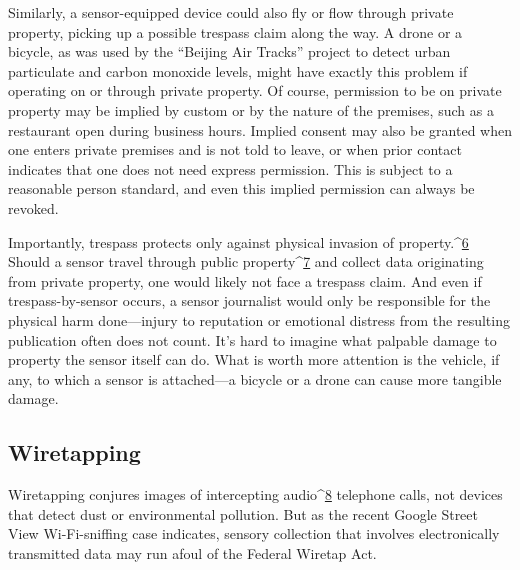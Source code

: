 Similarly, a sensor-equipped device could also fly or flow through private
property, picking up a possible trespass claim along the way. A drone or
a bicycle, as was used by the ``Beijing Air Tracks'' project to detect urban
particulate and carbon monoxide levels, might have exactly this problem if
operating on or through private property. Of course, permission to be on
private property may be implied by custom or by the nature of the premises,
such as a restaurant open during business hours. Implied consent may
also be granted when one enters private premises and is not told to leave,
or when prior contact indicates that one does not need express permission.
This is subject to a reasonable person standard, and even this implied permission
can always be revoked.

Importantly, trespass protects only against physical invasion of property.^{\href{#endnotes-syed}{6}}
Should a sensor travel through public property^{\href{#endnotes-syed}{7}} and collect data originating
from private property, one would likely not face a trespass claim. And even
if trespass-by-sensor occurs, a sensor journalist would only be responsible
for the physical harm done—injury to reputation or emotional distress from
the resulting publication often does not count. It's hard to imagine what
palpable damage to property the sensor itself can do. What is worth more
attention is the vehicle, if any, to which a sensor is attached—a bicycle or a
drone can cause more tangible damage.

\subsection{Wiretapping}

Wiretapping conjures images of intercepting audio^{\href{#endnotes-syed}{8}} telephone calls, not
devices that detect dust or environmental pollution. But as the recent
Google Street View Wi-Fi-sniffing case indicates, sensory collection that
involves electronically transmitted data may run afoul of the Federal Wiretap
Act.

